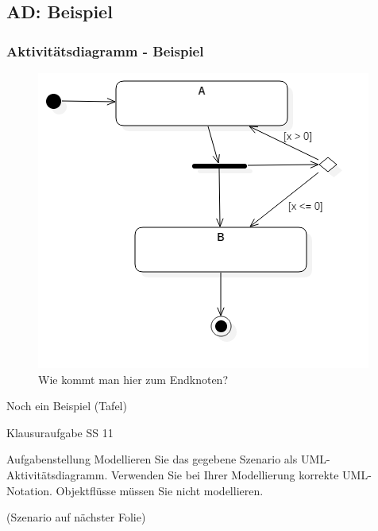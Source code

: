 \documentclass[18pt]{beamer}
\begin{document}
	\subsection{AD: Beispiel}
	\begin{frame}
		\frametitle{Aktivitätsdiagramm - Beispiel}
		\begin{figure}
			\centering
			\caption{Wie kommt man hier zum Endknoten?}
			\includegraphics[scale=0.4]{./pics/tut2/act_ex.png}
		\end{figure}
	\end{frame}

	\begin{frame}{Noch ein Beispiel}
	 	(Tafel)
\end{frame}

	\begin{frame}{Klausuraufgabe SS 11}
	\begin{exampleblock}{Aufgabenstellung}
		Modellieren Sie das gegebene Szenario als UML-Aktivitätsdiagramm. Verwenden Sie bei Ihrer
		Modellierung korrekte UML-Notation. Objektflüsse müssen Sie nicht modellieren. 
	\end{exampleblock}
	(Szenario auf nächster Folie)
\end{frame}
\end{document}
